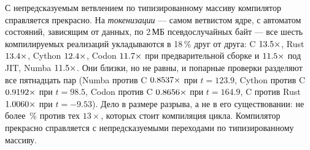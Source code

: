 С непредсказуемым ветвлением по типизированному массиву компилятор справляется прекрасно. На
\emph{токенизации} --- самом ветвистом ядре, с
автоматом состояний, зависящим от данных, по 2\,МБ псевдослучайных байт --- все шесть
компилируемых реализаций укладываются в 18\,\% друг от друга: C $\meas{ratio:b2_branchy-314:tokenize/cpython_loop|b2_branchy-314:tokenize/c_ctypes}{13.5}\times$, Rust $\meas{ratio:b2_branchy-314:tokenize/cpython_loop|b2_branchy-314:tokenize/rust_ctypes}{13.4}\times$,
Cython $\meas{ratio:b2_branchy-314:tokenize/cpython_loop|b2_branchy-314:tokenize/cython}{12.4}\times$, Codon $\meas{ratio:b2_branchy-314:tokenize/cpython_loop|b2_branchy-314:tokenize/codon_pyext}{11.7}\times$ при предварительной сборке и $\meas{ratio:b2_branchy-314:tokenize/cpython_loop|b2_branchy-314:tokenize/codon_jit}{11.5}\times$ под JIT, Numba
$\meas{ratio:b2_branchy-314:tokenize/cpython_loop|b2_branchy-314:tokenize/numba}{11.5}\times$. Они близки, но не равны, и попарные проверки разделяют все пятнадцать пар (Numba против
C $\meas{ratio:b2_branchy-314:tokenize/c_ctypes|b2_branchy-314:tokenize/numba}{0.8537}\times$ при $t=123.9$, Cython против C $\meas{ratio:b2_branchy-314:tokenize/c_ctypes|b2_branchy-314:tokenize/cython}{0.9192}\times$ при $t=98.5$, Codon против C
$\meas{ratio:b2_branchy-314:tokenize/c_ctypes|b2_branchy-314:tokenize/codon_pyext}{0.8656}\times$ при $t=164.9$, C против Rust $\meas{ratio:b2_branchy-314:tokenize/rust_ctypes|b2_branchy-314:tokenize/c_ctypes}{1.0060}\times$ при $t=-9.53$). Дело в размере разрыва, а не
в его существовании: не более \,\% против тех $13\times$, которых стоит компиляция цикла.
Компилятор прекрасно справляется с непредсказуемыми переходами по типизированному массиву.

